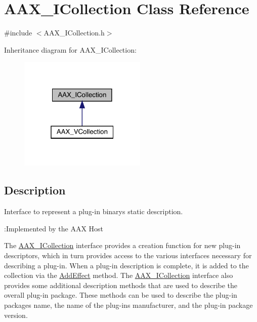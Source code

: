 \hypertarget{a01777}{}\section{A\+A\+X\+\_\+\+I\+Collection Class Reference}
\label{a01777}


{\ttfamily \#include $<$A\+A\+X\+\_\+\+I\+Collection.\+h$>$}



Inheritance diagram for A\+A\+X\+\_\+\+I\+Collection\+:
\nopagebreak
\begin{figure}[H]
\begin{center}
\leavevmode
\includegraphics[width=172pt]{a01776}
\end{center}
\end{figure}


\subsection{Description}
Interface to represent a plug-\/in binary\textquotesingle{}s static description. 

\begin{DoxyRefDesc}{\+:\+Implemented by the A\+A\+X Host}
\item[\mbox{\hyperlink{a00790__aax_host_implementation000002}{\+:\+Implemented by the A\+A\+X Host}}]\end{DoxyRefDesc}


The \mbox{\hyperlink{a01777}{A\+A\+X\+\_\+\+I\+Collection}} interface provides a creation function for new plug-\/in descriptors, which in turn provides access to the various interfaces necessary for describing a plug-\/in. When a plug-\/in description is complete, it is added to the collection via the \mbox{\hyperlink{a01777_a5ff114b8c4da2081515186f2faf65c8c}{Add\+Effect}} method. The \mbox{\hyperlink{a01777}{A\+A\+X\+\_\+\+I\+Collection}} interface also provides some additional description methods that are used to describe the overall plug-\/in package. These methods can be used to describe the plug-\/in package\textquotesingle{}s name, the name of the plug-\/in\textquotesingle{}s manufacturer, and the plug-\/in package version.

